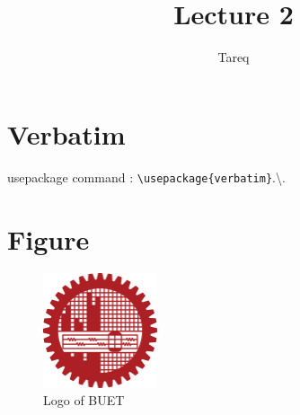 \documentclass{article}
\title{Lecture 2}
\author{Tareq}
\begin{document}
\maketitle
\tableofcontents
\listoffigures
\newpage


\section{Verbatim}

usepackage command : \verb|\usepackage{verbatim}|.\textbackslash.


\section{Figure}

\begin{figure}[h]
	\centering
	\includegraphics[width=0.3\textwidth]{buetlogo.png}
	\caption{Logo of BUET}
	\label{fig:buetlogo}
\end{figure}
\end{document}
